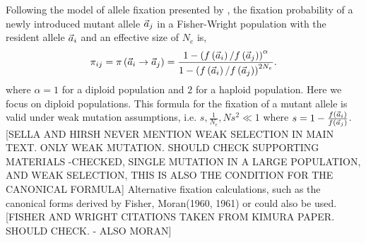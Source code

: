 Following the model of allele fixation presented by \citet{SellaAndHirsh05}, the fixation probability of a newly introduced mutant allele $\vec{a}_j$ in a Fisher-Wright population with the resident allele $\vec{a}_i$ and an effective size of $N_e$ is,
\begin{equation}
\pi_{ij} = \pi\left(\vec{a}_i \to \vec{a}_j \right) = \frac{1-\left(f\left(\vec{a}_i\right)/f\left(\vec{a}_j\right)\right)^\alpha}{1-\left(f\left(\vec{a}_i\right)/f\left(\vec{a}_j\right)\right)^{2N_e}}.
\label{eq:fixation}
\end{equation}
where $\alpha = 1$ for a diploid population and $2$ for a haploid population.
Here we focus on diploid populations.
This formula for the fixation of a mutant allele is valid under weak mutation assumptions, i.e. $s, \frac{1}{N_e}, Ns^2 \ll 1$ where $s=1-\frac{f(\vec{a}_i)}{f(\vec{a}_j)}$.[SELLA AND HIRSH NEVER MENTION WEAK SELECTION IN MAIN TEXT. ONLY WEAK MUTATION. SHOULD CHECK SUPPORTING MATERIALS -CHECKED, SINGLE MUTATION IN A LARGE POPULATION, AND WEAK SELECTION, THIS IS ALSO THE CONDITION FOR THE CANONICAL FORMULA] %
Alternative fixation calculations, such as the canonical forms derived by Fisher, Moran(1960, 1961) \citet{Fisher30, Wright31} or \citet{Kimura62} could also be used. [FISHER AND WRIGHT CITATIONS TAKEN FROM KIMURA PAPER. SHOULD CHECK. - ALSO MORAN] 

%
%




